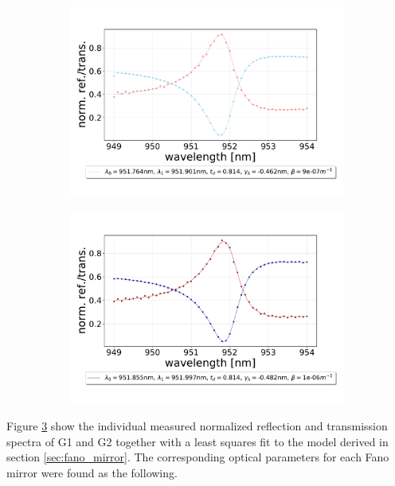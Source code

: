 \begin{figure}[h!]
    \centering
    \begin{subfigure}[b]{0.49\textwidth}
        \includegraphics[width=\textwidth]{figures/results/M3:M5/M5:G1_initial_spectrum.pdf}
        \caption{}
        \label{}
    \end{subfigure}
    \begin{subfigure}[b]{0.49\textwidth}
        \includegraphics[width=\textwidth]{figures/results/M3:M5/M3:G2_initial_spectrum.pdf}
        \caption{}
        \label{}
    \end{subfigure}
    \caption{}
    \label{fig:individual_G1_and_G2_spectra}
\end{figure}

Figure \ref{fig:individual_G1_and_G2_spectra} show the individual measured normalized reflection and transmission spectra of G1 and G2 together with a least squares fit to the model derived in section \ref{sec:fano_mirror}. The corresponding optical parameters for each Fano mirror were found as the following.

